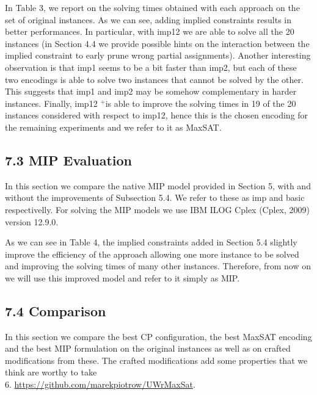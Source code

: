\documentclass[10pt]{article}
\begin{document}
In Table 3, we report on the solving times obtained with each approach on the set of original instances. As we can see, adding implied constraints results in better performances. In particular, with imp12 we are able to solve all the 20 instances (in Section 4.4 we provide possible hints on the interaction between the implied constraint to early prune wrong partial assignments). Another interesting observation is that imp1 seems to be a bit faster than imp2, but each of these two encodings is able to solve two instances that cannot be solved by the other. This suggests that imp1 and imp2 may be somehow complementary in harder instances. Finally, imp12 ${ }^{+}$is able to improve the solving times in 19 of the 20 instances considered with respect to imp12, hence this is the chosen encoding for the remaining experiments and we refer to it as MaxSAT.

\subsection*{7.3 MIP Evaluation}
In this section we compare the native MIP model provided in Section 5, with and without the improvements of Subsection 5.4. We refer to these as imp and basic respectivelly. For solving the MIP models we use IBM ILOG Cplex (Cplex, 2009) version 12.9.0.

As we can see in Table 4, the implied constraints added in Section 5.4 slightly improve the efficiency of the approach allowing one more instance to be solved and improving the solving times of many other instances. Therefore, from now on we will use this improved model and refer to it simply as MIP.

\subsection*{7.4 Comparison}
In this section we compare the best CP configuration, the best MaxSAT encoding and the best MIP formulation on the original instances as well as on crafted modifications from these. The crafted modifications add some properties that we think are worthy to take\\
6. \href{https://github.com/marekpiotrow/UWrMaxSat}{https://github.com/marekpiotrow/UWrMaxSat}.
\end{document}
